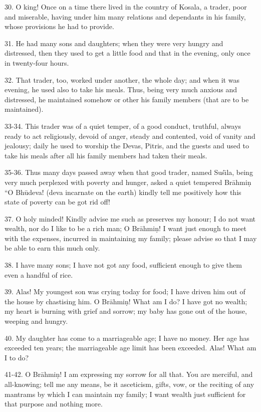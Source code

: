 30. O king! Once on a time there lived in the country of Kosala, a trader, poor and miserable, having under him many relations and dependants in his family, whose provisions he had to provide.

31. He had many sons and daughters; when they were very hungry and distressed, then they used to get a little food and that in the evening, only once in twenty-four hours.

32. That trader, too, worked under another, the whole day; and when it was evening, he used also to take his meals. Thus, being very much anxious and distressed, he maintained somehow or other his family members (that are to be maintained).

33-34. This trader was of a quiet temper, of a good conduct, truthful, always ready to act religiously, devoid of anger, steady and contented, void of vanity and jealousy; daily he used to worship the Devas, Pitris, and the guests and used to take his meals after all his family members had taken their meals.

35-36. Thus many days passed away when that good trader, named Su\'s\={\i}la, being very much perplexed with poverty and hunger, asked a quiet tempered Br\=ahmi\d{n} ``O Bh\=udeva! (deva incarnate on the earth) kindly tell me positively how this state of poverty can be got rid off!

37. O holy minded! Kindly advise me such as preserves my honour; I do not want wealth, nor do I like to be a rich man; O Br\=ahmi\d{n}! I want just enough to meet with the expenses, incurred in maintaining my family; please advise so that I may be able to earn this much only.

38. I have many sons; I have not got any food, sufficient enough to give them even a handful of rice.

39. Alas! My youngest son was crying today for food; I have driven him out of the house by chastising him. O Br\=ahmi\d{n}! What am I do? I have got no wealth; my heart is burning with grief and sorrow; my baby has gone out of the house, weeping and hungry.

40. My daughter has come to a marriageable age; I have no money. Her age has exceeded ten years; the marriageable age limit has been exceeded. Alas! What am I to do?

41-42. O Br\=ahmi\d{n}! I am expressing my sorrow for all that. You are merciful, and all-knowing; tell me any means, be it asceticism, gifts, vow, or the reciting of any mantrams by which I can maintain my family; I want wealth just sufficient for that purpose and nothing more.

